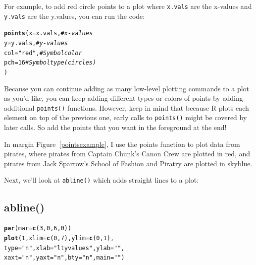 \documentclass{tufte-book}\usepackage[]{graphicx}\usepackage[]{color}
\makeatletter
\newcommand{\hlnum}[1]{\textcolor[rgb]{0.686,0.059,0.569}{#1}}%
\newcommand{\hlstr}[1]{\textcolor[rgb]{0.192,0.494,0.8}{#1}}%
\newcommand{\hlcom}[1]{\textcolor[rgb]{0.678,0.584,0.686}{\textit{#1}}}%
\newcommand{\hlstd}[1]{\textcolor[rgb]{0.345,0.345,0.345}{#1}}%
\newcommand{\hlkwc}[1]{\textcolor[rgb]{0.333,0.667,0.333}{#1}}%
\newcommand{\hlkwd}[1]{\textcolor[rgb]{0.737,0.353,0.396}{\textbf{#1}}}%
\newenvironment{kframe}{%
 \def\at@end@of@kframe{}%
 \ifinner\ifhmode%
  \def\at@end@of@kframe{\end{minipage}}%
  \begin{minipage}{\columnwidth}%
 \fi\fi%
 \def\FrameCommand##1{\hskip\@totalleftmargin \hskip-\fboxsep
 \colorbox{shadecolor}{##1}\hskip-\fboxsep
     \hskip-\linewidth \hskip-\@totalleftmargin \hskip\columnwidth}%
 \MakeFramed {\advance\hsize-\width
   \@totalleftmargin\z@ \linewidth\hsize
   \@setminipage}}%
 {\par\unskip\endMakeFramed%
 \at@end@of@kframe}
\newenvironment{knitrout}{}{} %
\makeatother
\begin{document}
\begin{footnotesize}
{{\begin{description}
  
\end{description}

}
}
\vspace{5mm} %


For example, to add red circle points to a plot where \texttt{x.vals} are the x-values and \texttt{y.vals} are the y.values, you can run the code:

\begin{knitrout}
\color{fgcolor}\begin{kframe}
\begin{alltt}
\hlkwd{points}\hlstd{(}\hlkwc{x} \hlstd{= x.vals,} \hlcom{# x-values}
       \hlkwc{y} \hlstd{= y.vals,} \hlcom{# y-values}
       \hlkwc{col} \hlstd{=} \hlstr{"red"}\hlstd{,} \hlcom{# Symbol color}
       \hlkwc{pch} \hlstd{=} \hlnum{16} \hlcom{# Symbol type (circles)}
       \hlstd{)}
\end{alltt}
\end{kframe}
\end{knitrout}

Because you can continue adding as many low-level plotting commands to a plot as you'd like, you can keep adding different types or colors of points by adding additional \texttt{points()} functions. However, keep in mind that because R plots each element on top of the previous one, early calls to \texttt{points()} might be covered by later calls. So add the points that you want in the foreground at the end!

In margin Figure~\ref{pointsexample}, I use the points function to plot data from pirates, where pirates from Captain Chunk's Canon Crew are plotted in red, and pirates from Jack Sparrow's School of Fashion and Piratry are plotted in skyblue.

Next, we'll look at \texttt{abline()} which adds straight lines to a plot:


\subsection{abline()}

\begin{marginfigure}
\begin{tiny}
\begin{knitrout}
\color{fgcolor}\begin{kframe}
\begin{alltt}
\hlkwd{par}\hlstd{(}\hlkwc{mar} \hlstd{=} \hlkwd{c}\hlstd{(}\hlnum{3}\hlstd{,} \hlnum{0}\hlstd{,} \hlnum{6}\hlstd{,} \hlnum{0}\hlstd{))}
\hlkwd{plot}\hlstd{(}\hlnum{1}\hlstd{,} \hlkwc{xlim} \hlstd{=} \hlkwd{c}\hlstd{(}\hlnum{0}\hlstd{,} \hlnum{7}\hlstd{),} \hlkwc{ylim} \hlstd{=} \hlkwd{c}\hlstd{(}\hlnum{0}\hlstd{,} \hlnum{1}\hlstd{),}
     \hlkwc{type} \hlstd{=} \hlstr{"n"}\hlstd{,} \hlkwc{xlab} \hlstd{=} \hlstr{"lty values"}\hlstd{,} \hlkwc{ylab} \hlstd{=} \hlstr{""}\hlstd{,}
     \hlkwc{xaxt} \hlstd{=} \hlstr{"n"}\hlstd{,} \hlkwc{yaxt} \hlstd{=} \hlstr{"n"}\hlstd{,} \hlkwc{bty} \hlstd{=} \hlstr{"n"}\hlstd{,} \hlkwc{main} \hlstd{=} \hlstr{""}\hlstd{)}


\end{alltt}
\end{kframe}
\end{knitrout}
\end{tiny}
\end{marginfigure}
\end{footnotesize}
\end{document}
